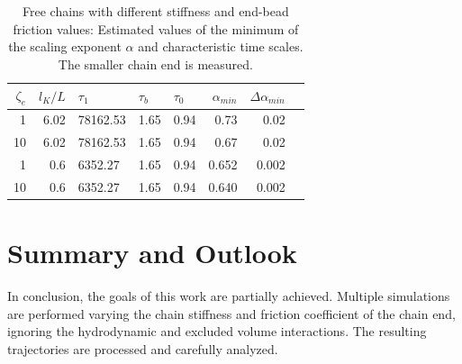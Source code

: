 \documentclass[
    paper=A4,pagesize=automedia,fontsize=12pt,
    BCOR=15mm,DIV=22,
    twoside,headinclude,footinclude=false,
    fleqn,             %
    bibliography=totocnumbered,          %
    listof=totoc,                %
    listof=flat,                 %
    cleardoublepage=empty      %
    numbers=endperiod
]{scrartcl}
\begin{document}
\begin{table}[H]
    \centering
    
    \begin{tabular}{rrlllrrr}
        \toprule
        $\zeta_e$ & $l_K/L$ & $\tau_1$ & $\tau_b$ & $\tau_0$ & $\alpha_{min}$ & $\Delta \alpha_{min}$ \\
        \midrule
        1 & 6.02 & 78162.53 & 1.65 & 0.94 & 0.73 & 0.02 \\
        10 & 6.02 & 78162.53 & 1.65 & 0.94 & 0.67 & 0.02 \\
        1 & 0.6 & 6352.27 & 1.65 & 0.94 & 0.652 & 0.002 \\
        10 & 0.6 & 6352.27 & 1.65 & 0.94 & 0.640 & 0.002 \\
        \bottomrule
        \end{tabular}
    \caption{
        Free chains with different stiffness and end-bead friction values: 
        Estimated values of the minimum of the scaling exponent $\alpha$ and
        characteristic time scales. The smaller chain end is measured.
    }
    \label{table:free_chain_alpha_estimations_fm}
\end{table}

\section{Summary and Outlook}
In conclusion, the goals of this work are partially achieved. Multiple simulations 
are performed varying the chain stiffness and friction coefficient of the chain end, 
ignoring the hydrodynamic and excluded volume interactions. 
The resulting trajectories are processed and carefully analyzed. 
\end{document}
